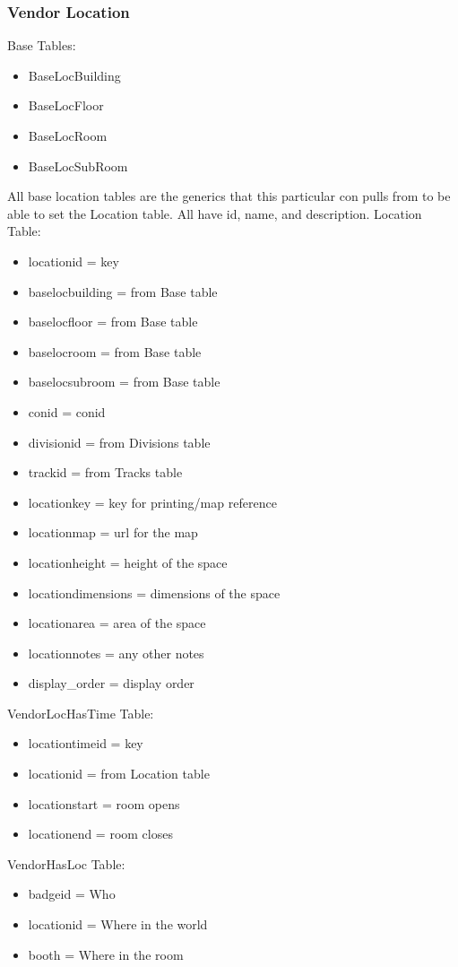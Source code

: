 \documentclass[captions=tablesignature]{scrartcl}
\begin{document}
\subsubsection{Vendor Location}
\label{sec-2-5-14}
Base Tables:
\begin{itemize}
\item BaseLocBuilding
\item BaseLocFloor
\item BaseLocRoom
\item BaseLocSubRoom
\end{itemize}
All base location tables are the generics that this particular
con pulls from to be able to set the Location table.  All have
id, name, and description.
 Location Table:
\begin{itemize}
\item locationid = key
\item baselocbuilding = from Base table
\item baselocfloor = from Base table
\item baselocroom = from Base table
\item baselocsubroom = from Base table
\item conid = conid
\item divisionid = from Divisions table
\item trackid = from Tracks table
\item locationkey = key for printing/map reference
\item locationmap = url for the map
\item locationheight = height of the space
\item locationdimensions = dimensions of the space
\item locationarea = area of the space
\item locationnotes = any other notes
\item display\_order = display order
\end{itemize}
VendorLocHasTime Table:
\begin{itemize}
\item locationtimeid = key
\item locationid = from Location table
\item locationstart = room opens
\item locationend = room closes
\end{itemize}
VendorHasLoc Table:
\begin{itemize}
\item badgeid = Who
\item locationid = Where in the world
\item booth = Where in the room
\end{itemize}
\end{document}
